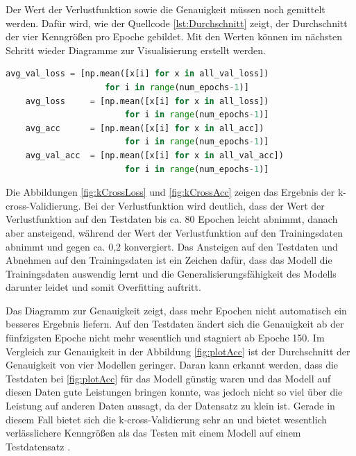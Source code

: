 Der Wert der Verlustfunktion sowie die Genauigkeit müssen noch gemittelt werden. Dafür wird, wie der Quellcode \ref*{lst:Durchschnitt} zeigt, der Durchschnitt 
der vier Kenngrößen pro Epoche gebildet. Mit den Werten können im nächsten Schritt wieder Diagramme zur Visualisierung erstellt werden.
\begin{lstlisting}[language = python, caption={Mitteln der Ergebnisse \cite{DL_PY}},captionpos=b, label = lst:Durchschnitt, floatplacement=H]
    avg_val_loss = [np.mean([x[i] for x in all_val_loss])
                    for i in range(num_epochs-1)]
    avg_loss     = [np.mean([x[i] for x in all_loss])
                        for i in range(num_epochs-1)]
    avg_acc      = [np.mean([x[i] for x in all_acc])
                        for i in range(num_epochs-1)]
    avg_val_acc  = [np.mean([x[i] for x in all_val_acc])
                        for i in range(num_epochs-1)]
\end{lstlisting}
Die Abbildungen \ref*{fig:kCrossLoss} und \ref*{fig:kCrossAcc} zeigen das Ergebnis der k-cross-Validierung. Bei der Verlustfunktion wird deutlich, dass
der Wert der Verlustfunktion auf den Testdaten bis ca. 80 Epochen leicht abnimmt, danach aber ansteigend, während der Wert der Verlustfunktion 
auf den Trainingsdaten abnimmt und gegen ca. 0,2 konvergiert. Das Ansteigen auf den Testdaten und Abnehmen auf den Trainingsdaten ist ein Zeichen dafür,
dass das Modell die Trainingsdaten auswendig lernt und die Generalisierungsfähigkeit des Modells darunter leidet und somit Overfitting auftritt.

Das Diagramm zur Genauigkeit zeigt, dass mehr Epochen nicht automatisch ein besseres Ergebnis liefern. Auf den Testdaten ändert sich die Genauigkeit 
ab der fünfzigsten Epoche nicht mehr wesentlich und stagniert ab Epoche 150. Im Vergleich zur Genauigkeit in der Abbildung \ref*{fig:plotAcc} 
ist der Durchschnitt der Genauigkeit von vier Modellen geringer. Daran kann erkannt werden, dass die Testdaten bei \ref*{fig:plotAcc} für das Modell günstig 
waren und das Modell auf diesen Daten gute Leistungen bringen konnte, was jedoch nicht so viel über die Leistung auf anderen Daten aussagt, da der Datensatz zu klein ist. 
Gerade in diesem Fall bietet sich die k-cross-Validierung sehr an und bietet wesentlich verlässlichere Kenngrößen als das Testen mit einem Modell auf einem 
Testdatensatz \cite[vgl. S.123]{DL_PY}.

